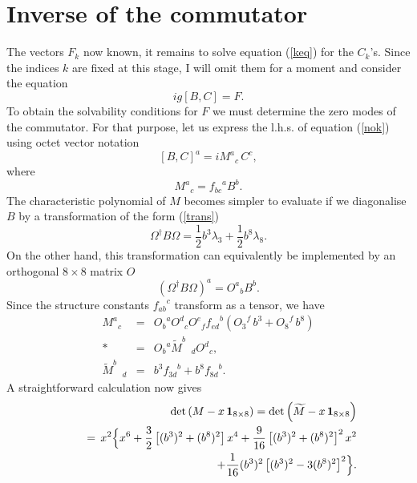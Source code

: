 \documentclass[a4paper,12pt]{article}
\begin{document}
\section{Inverse of the commutator}

The vectors $F_k$ now known, it remains to solve equation (\ref{keq}) for the $C_k$'s. Since the indices $k$ are fixed at this stage, I will omit them for a moment and consider the equation
\begin{equation}\label{nok}
ig [B,C] = F.
\end{equation}
To obtain the solvability conditions for $F$ we must determine the zero modes of the commutator. For that purpose, let us express the l.h.s. of equation (\ref{nok}) using octet vector notation
\begin{equation}\label{adj}
[B,C]^a = i {M^a}_c \, C^c,
\end{equation}
where
\begin{equation}\label{mdef}
{M^a}_c = {f_{bc}}^a B^b.
\end{equation}
The characteristic polynomial of $M$ becomes simpler to evaluate if we diagonalise $B$ by a transformation of the form (\ref{trans})
\begin{equation}\label{diag}
\Omega^{\dagger} B \Omega = \frac{1}{2} b^3 \lambda_3 + \frac{1}{2} b^8 \lambda_8.
\end{equation}
On the other hand, this transformation can equivalently be implemented by an orthogonal $8 \times 8$ matrix $O$
\begin{equation}\label{uuu}
\left( \Omega^{\dagger} B \Omega \right)^a = {O^a}_b B^b.
\end{equation}
Since the structure constants ${f_{ab}}^c$ transform as a tensor, we have
\begin{eqnarray*}
{M^a}_c &=& {O_b}^a {O^d}_c {O^e}_f {f_{ed}}^b \left( {O_3}^f \, b^3 + {O_8}^f \, b^8 
 \right) \\*
&=& {O_b}^a {\widetilde{M}^b}_{\,\,\,\, d} {O^d}_c, \\
{\widetilde{M}^b}_{\,\,\,\, d} &=& b^3 {f_{3d}}^b + b^8 {f_{8d}}^b. 
\end{eqnarray*}
A straightforward calculation now gives
\begin{eqnarray*}
&& \det \left( M - x \, {\bf 1}_{8 \times 8} \right) =  \det \left( \widetilde{M} - x \, {\bf 1}_{8 \times 8} \right) \\*
&& \hspace{1.4em} = \, x^2 \Bigl\{ x^6 + \frac{3}{2} \left[ (b^3)^2 + (b^8)^2 \right] x^4 + \frac{9}{16} \left[ (b^3)^2 + (b^8)^2 \right]^2 x^2 \\
&& \hspace{4.1em} + \frac{1}{16} (b^3)^2 \left[ (b^3)^2 - 3 (b^8)^2 \right]^2 \Bigr\}.
\end{eqnarray*}
\end{document}
